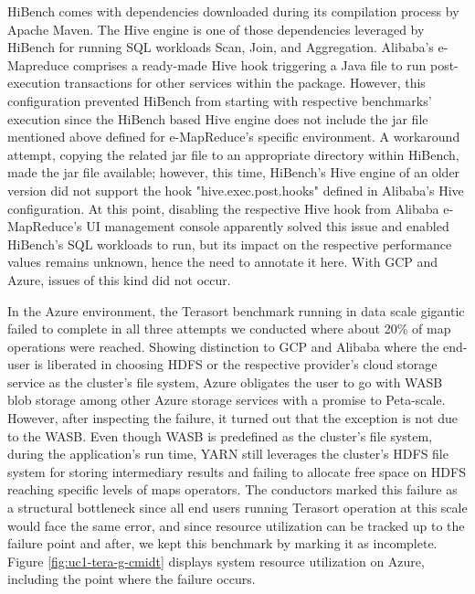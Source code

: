 \documentclass[review]{elsarticle}
\begin{document}
HiBench comes with dependencies downloaded during its compilation process by Apache Maven. The Hive engine is one of those dependencies leveraged by HiBench for running SQL workloads Scan, Join, and Aggregation. Alibaba's e-Mapreduce comprises a ready-made Hive hook triggering a Java file to run post-execution transactions for other services within the package. However, this configuration prevented HiBench from starting with respective benchmarks' execution since the HiBench based Hive engine does not include the jar file mentioned above defined for e-MapReduce's specific environment. A workaround attempt, copying the related jar file to an appropriate directory within HiBench, made the jar file available; however, this time, HiBench's Hive engine of an older version did not support the hook "hive.exec.post.hooks" defined in Alibaba's Hive configuration. At this point, disabling the respective Hive hook from Alibaba e-MapReduce's UI management console apparently solved this issue and enabled HiBench's SQL workloads to run, but its impact on the respective performance values remains unknown, hence the need to annotate it here. With GCP and Azure, issues of this kind did not occur.

In the Azure environment, the Terasort benchmark running in data scale gigantic failed to complete in all three attempts we conducted where about 20\% of map operations were reached. Showing distinction to GCP and Alibaba where the end-user is liberated in choosing HDFS or the respective provider's cloud storage service as the cluster's file system, Azure obligates the user to go with WASB blob storage among other Azure storage services with a promise to Peta-scale. However, after inspecting the failure, it turned out that the exception is not due to the WASB. Even though WASB is predefined as the cluster's file system, during the application's run time, YARN still leverages the cluster's HDFS file system for storing intermediary results and failing to allocate free space on HDFS reaching specific levels of maps operators. The conductors marked this failure as a structural bottleneck since all end users running Terasort operation at this scale would face the same error, and since resource utilization can be tracked up to the failure point and after, we kept this benchmark by marking it as incomplete. Figure \ref{fig:uc1-tera-g-cmidt} displays system resource utilization on Azure, including the point where the failure occurs.
\end{document}
